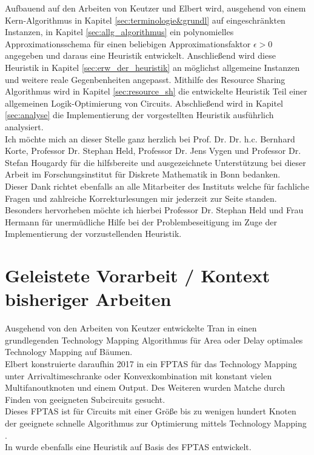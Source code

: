 \documentclass[11pt, a4paper, german]{article}
\newcommand{\TM}{Technology  Mapping }
\begin{document}
Aufbauend auf den Arbeiten von Keutzer \cite{DAGON} und  Elbert \cite{Elbert} wird, ausgehend von einem Kern-Algorithmus in Kapitel \ref{sec:terminologie&grundl} auf eingeschränkten Instanzen, in Kapitel \ref{sec:allg_algorithmus} ein polynomielles Approximationsschema für einen beliebigen Approximationsfaktor $\epsilon > 0$ angegeben und daraus eine Heuristik entwickelt. Anschließend wird diese Heuristik  in Kapitel \ref{sec:erw_der_heuristik} an möglichst allgemeine Instanzen und weitere reale Gegenbenheiten angepasst. Mithilfe des Resource Sharing Algorithmus wird in Kapitel \ref{sec:resource_sh} die entwickelte Heuristik Teil einer allgemeinen Logik-Optimierung von Circuits. Abschließend wird in Kapitel \ref{sec:analyse} die Implementierung der vorgestellten Heuristik ausführlich analysiert.\\

Ich m\"ochte mich an dieser Stelle ganz herzlich bei Prof. Dr. Dr. h.c. Bernhard Korte, Professor Dr. Stephan Held, Professor Dr. Jens Vygen und Professor Dr. Stefan Hougardy f\"ur die hilfsbereite und ausgezeichnete Unterst\"utzung bei dieser Arbeit im Forschungsinstitut f\"ur Diskrete Mathematik in Bonn bedanken.\\
Dieser Dank richtet ebenfalls an alle Mitarbeiter des Instituts welche f\"ur fachliche Fragen und zahlreiche Korrekturlesungen mir jederzeit zur Seite standen.\\
Besonders hervorheben m\"ochte ich hierbei Professor Dr. Stephan Held und Frau Hermann f\"ur unermüdliche Hilfe bei der Problembeseitigung im Zuge der Implementierung der vorzustellenden Heuristik.
\section{Geleistete Vorarbeit / Kontext bisheriger Arbeiten}
Ausgehend von den Arbeiten von Keutzer \cite{DAGON} entwickelte Tran in \cite{Tran} einen grundlegenden \TM Algorithmus f\"ur Area oder Delay optimales \TM auf B\"aumen.\\
Elbert konstruierte daraufhin 2017 in \cite{Elbert} ein FPTAS f\"ur das \TM unter Arrivaltimeschranke oder Konvexkombination mit konstant vielen Multifanoutknoten und einem Output. Des Weiteren wurden Matche durch Finden von geeigneten Subcircuits gesucht.\\
Dieses FPTAS ist f\"ur Circuits mit einer Gr\"o{\ss}e bis zu wenigen hundert Knoten der geeignete schnelle Algorithmus zur Optimierung mittels \TM.\\
In \cite{Elbert} wurde ebenfalls eine Heuristik auf Basis des FPTAS entwickelt. 
\end{document}
